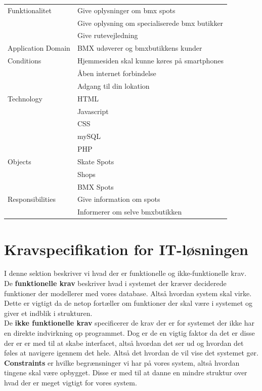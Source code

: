 \documentclass[12pt]{article}
\begin{document}
\begin{raggedleft}
  \begin{tabular}{| l | l |}
    \hline
    Funktionalitet & Give oplysninger om bmx spots\\ & Give oplysning om specialiserede bmx butikker\\ & Give rutevejledning\\ \hline
    Application Domain & BMX udøverer og bmxbutikkens kunder\\ \hline
    Conditions & Hjemmesiden skal kunne køres på smartphones\\ & Åben internet forbindelse \\ & Adgang til din lokation\\
    \hline
        Technology & HTML \\ & Javascript \\ & CSS\\ & mySQL\\ & PHP\\
    \hline
        Objects & Skate Spots\\ & Shops\\ & BMX Spots\\
    \hline
        Responsibilities & Give information om spots\\ & Informerer om selve bmxbutikken\\
    \hline
  \end{tabular}
\end{raggedleft}


\pagebreak

\section{Kravspecifikation for IT-løsningen}
I denne sektion beskriver vi hvad der er funktionelle og ikke-funktionelle krav.\\
De \textbf{funktionelle krav }beskriver hvad i systemet der kræver deciderede funktioner der modellerer med vores database. Altså hvordan system skal virke. Dette er vigtigt da de netop fortæller om funktioner der skal være i systemet og giver et indblik i strukturen.\\
De \textbf{ikke funktionelle krav} specificerer de krav der er for systemet der ikke har en direkte indvirkning op programmet. Dog er de en vigtig faktor da det er disse der er er med til at skabe interfacet, altså hvordan det ser ud og hvordan det føles at navigere igennem det hele. Altså det hvordan de vil vise det systemet gør.\\ 
\textbf{Constraints} er hvilke begrænsninger vi har på vores system, altså hvordan tingene skal være opbygget. Disse er med til at danne en mindre struktur over hvad der er meget vigtigt for vores system.
\end{document}
